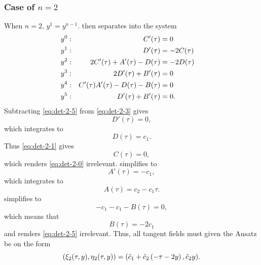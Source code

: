 \subsubsection{Case of \texorpdfstring{\(n=2\)}{n is 2}}

When \(n=2\), \(y^1 = y^{n-1}\).
 then separates into the system
\begin{subequations}
  \begin{flalign}
      y^0:  && C'(\tau) &= 0                               &&\FlLabel{eq:det-2-0}\\
      y^1:  && D'(\tau) &= -2C(\tau)                       &&\FlLabel{eq:det-2-1}\\
      y^2:  && 2C'(\tau) + A'(\tau) - D(\tau) &= -2D(\tau) &&\FlLabel{eq:det-2-2}\\
      y^3:  && 2D'(\tau) + B'(\tau) &= 0                   &&\FlLabel{eq:det-2-3}\\
      y^4:  && C'(\tau) A'(\tau) - D(\tau) - B(\tau) &= 0  &&\FlLabel{eq:det-2-4}\\
      y^5:  && D'(\tau) + B'(\tau) &= 0.                   &&\FlLabel{eq:det-2-5}
  \end{flalign}
\end{subequations}
Subtracting \cref{eq:det-2-5} from \cref{eq:det-2-3} gives
\begin{equation}
  D'(\tau) = 0,
\end{equation}
which integrates to
\begin{equation}
  D(\tau) = c_1.
\end{equation}
Thus \cref{eq:det-2-1} gives
\begin{equation}
  C(\tau) = 0,
\end{equation}
which renders \cref{eq:det-2-0} irrelevant.
 simplifies to
\begin{equation}
  A'(\tau) = - c_1,
\end{equation}
which integrates to
\begin{equation}
  A(\tau) = c_2 - c_1 \tau.
\end{equation}
 simplifies to
\begin{equation}
  - c_1 - c_1 - B(\tau) = 0,
\end{equation}
which means that
\begin{equation}
  B(\tau) = -2 c_1
\end{equation}
and renders \cref{eq:det-2-5} irrelevant.
Thus, all tangent fields must given the Ansatz be on the form
\begin{equation} \label{eq:hill-tangent-field-2}
  \pqty{\xi_2(\tau,y),\eta_2(\tau,y)} = 
  \pqty{\tilde{c}_1 + \tilde{c}_2 \left( - \tau -2 y \right), \tilde{c}_2 y}.
\end{equation}

